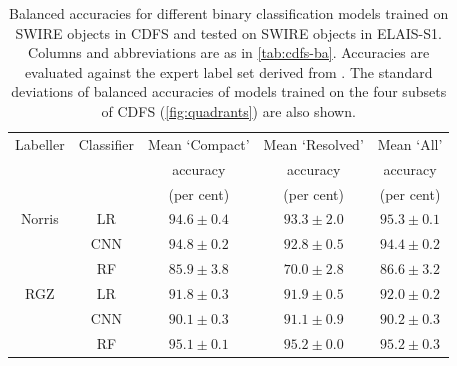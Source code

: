   \begin{table}
    \caption[Balanced accuracies for different binary classification models on ELAIS-S1.]{Balanced accuracies for different binary classification models trained on SWIRE objects
    in CDFS and tested on SWIRE objects in ELAIS-S1. Columns and abbreviations are as in \autoref{tab:cdfs-ba}. Accuracies are evaluated against the expert
    label set derived from \citet{middelberg08}. The standard deviations of balanced accuracies of models trained on the four subsets of
    CDFS (\autoref{fig:quadrants}) are also shown.}
    \label{tab:elais-ba}
    \small\centering
    \begingroup
    \setlength{\tabcolsep}{8pt} %
    \begin{tabular}{ccccc}
      \hline\hline
      Labeller & Classifier & Mean `Compact' & Mean `Resolved' & Mean `All'\\
        &  & accuracy & accuracy & accuracy\\
        &  & (per cent) & (per cent) & (per cent)\\
      \hline
      Norris & LR & $94.6 \pm 0.4$ & $93.3 \pm 2.0$ & $95.3 \pm 0.1$\\
       & CNN & $94.8 \pm 0.2$ & $92.8 \pm 0.5$ & $94.4 \pm 0.2$\\
       & RF & $85.9 \pm 3.8$ & $70.0 \pm 2.8$ & $86.6 \pm 3.2$\\
      RGZ & LR & $91.8 \pm 0.3$ & $91.9 \pm 0.5$ & $92.0 \pm 0.2$\\
       & CNN & $90.1 \pm 0.3$ & $91.1 \pm 0.9$ & $90.2 \pm 0.3$\\
       & RF & $95.1 \pm 0.1$ & $95.2 \pm 0.0$ & $95.2 \pm 0.3$\\
      \hline\hline
    \end{tabular}
    \endgroup
  \end{table}

